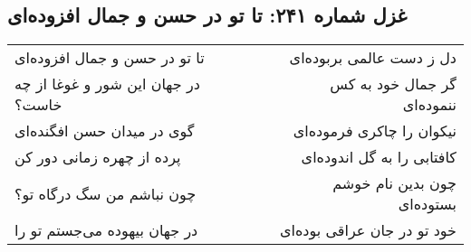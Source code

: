\begin{center}
\section*{غزل شماره ۲۴۱: تا تو در حسن و جمال افزوده‌ای}
\label{sec:241}
\begin{longtable}{l p{0.5cm} r}
تا تو در حسن و جمال افزوده‌ای
&&
دل ز دست عالمی بربوده‌ای
\\
در جهان این شور و غوغا از چه خاست؟
&&
گر جمال خود به کس ننموده‌ای
\\
گوی در میدان حسن افگنده‌ای
&&
نیکوان را چاکری فرموده‌ای
\\
پرده از چهره زمانی دور کن
&&
کافتابی را به گل اندوده‌ای
\\
چون نباشم من سگ درگاه تو؟
&&
چون بدین نام خوشم بستوده‌ای
\\
در جهان بیهوده می‌جستم تو را
&&
خود تو در جان عراقی بوده‌ای
\\
\end{longtable}
\end{center}
